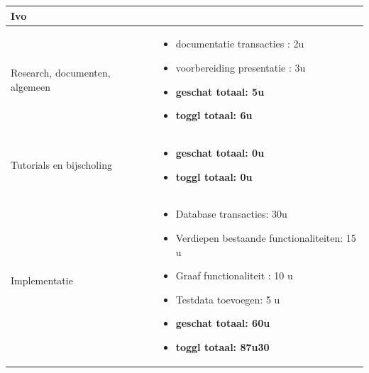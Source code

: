 \documentclass{article}
\begin{document}
\begin{center}
\begin{tabularx}{\textwidth}[t]{XX}
\arrayrulecolor{green}\hline


\vspace{.1 mm}
\textbf{\textcolor{myGreen}{\large{Ivo}}} \vspace{.1 mm} & \\
\hline
\vspace{1 mm}
Research, documenten, algemeen & 
\begin{minipage}[t]{\linewidth}%
\vspace{1 mm}
\begin{itemize}
\item documentatie transacties : 2u
\item voorbereiding presentatie : 3u
\item \textbf{geschat totaal: 5u}
\item \textbf{toggl totaal: 6u}
\end{itemize} 
\vspace{1 mm}
\end{minipage}\\

\arrayrulecolor{black}\hline

\vspace{1 mm}
Tutorials en bijscholing & 
\begin{minipage}[t]{\linewidth}%
\vspace{1 mm}
\begin{itemize}
\item \textbf{geschat totaal: 0u}
\item \textbf{toggl totaal: 0u}
\end{itemize} 
\vspace{1 mm}
\end{minipage}\\

\arrayrulecolor{black}\hline


\vspace{1 mm}
Implementatie & 
\begin{minipage}[t]{\linewidth}%
\vspace{1 mm}
\begin{itemize}
\item Database transacties: 30u
\item Verdiepen bestaande functionaliteiten: 15 u
\item Graaf functionaliteit : 10 u
\item Testdata toevoegen: 5 u
\item \textbf{geschat totaal: 60u}
\item \textbf{toggl totaal: 87u30}
\end{itemize} 
\vspace{1 mm}
\end{minipage}\\



\end{tabularx}
\end{center}
\end{document}
